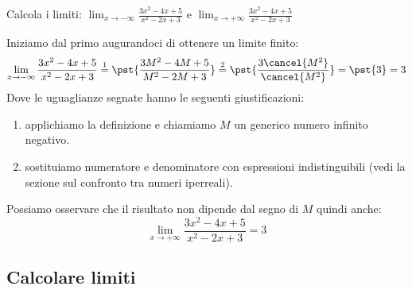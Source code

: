 \begin{esempio}
Calcola i limiti: 
\(\displaystyle \lim_{x \to -\infty}\frac{3x^2-4x+5}{x^2-2x+3}\)
\quad e \quad
\(\displaystyle \lim_{x \to +\infty}\frac{3x^2-4x+5}{x^2-2x+3}\)

Iniziamo dal primo augurandoci di ottenere un limite finito:
\[\lim_{x \to -\infty}\frac{3x^2-4x+5}{x^2-2x+3} \stackrel{1}{=} 
\pst{\frac{3M^2-4M+5}{M^2-2M+3}} \stackrel{2}{=} 
\pst{\frac{3\cancel{M^2}}{\cancel{M^2}}} = \pst{3} = 3\]
Dove le uguaglianze segnate hanno le seguenti giustificazioni:
\begin{enumerate} [nosep]
\item applichiamo la definizione e chiamiamo \(M\) un generico numero 
infinito negativo.
\item sostituiamo numeratore e denominatore con espressioni indistinguibili 
(vedi la sezione sul confronto tra numeri iperreali).
\end{enumerate}
Possiamo osservare che il risultato non dipende dal segno di \(M\) quindi 
anche: 
\[\displaystyle \lim_{x \to +\infty}\frac{3x^2-4x+5}{x^2-2x+3} = 3\]


\begin{center} \limiteallinfinito \end{center}
\end{esempio}

\subsection{Calcolare limiti}
\label{subsec:cont_limiti_calcolo}

